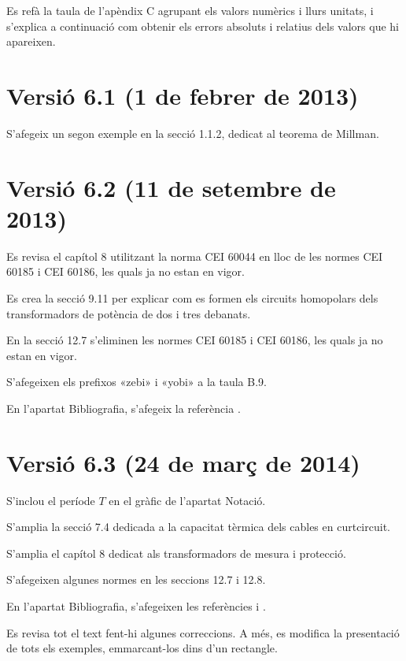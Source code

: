 Es refà la taula de l'apèndix C agrupant els valors numèrics i llurs unitats, i s'explica a continuació com obtenir els errors absoluts i relatius dels valors que hi apareixen.

\section*{Versió 6.1 (1 de febrer de 2013)}

S'afegeix un segon exemple en la secció 1.1.2, dedicat al teorema de Millman.


\section*{Versió 6.2 (11 de setembre de 2013)}

 Es revisa el capítol 8 utilitzant la norma CEI 60044 en lloc de les normes CEI 60185 i CEI 60186, les quals ja no estan en vigor.

Es crea la secció 9.11 per explicar com es formen els circuits homopolars dels transformadors de potència de dos i tres debanats.

En la secció 12.7 s'eliminen les normes CEI 60185 i CEI 60186, les quals ja no estan en vigor.

S'afegeixen els prefixos «zebi» i «yobi» a la taula B.9.

En l'apartat Bibliografia, s'afegeix la referència \cite{RASe}.

\section*{Versió 6.3 (24 de març de 2014)}

S'inclou el període $T$ en el gràfic de l'apartat Notació.

S'amplia la secció 7.4 dedicada a la capacitat tèrmica dels cables en curtcircuit.

S'amplia el capítol 8 dedicat als transformadors de mesura i protecció.

S'afegeixen algunes normes en les seccions 12.7 i 12.8.

En l'apartat Bibliografia, s'afegeixen les referències \cite{KAS} i \cite{JCD}.

Es revisa tot el text fent-hi algunes correccions. A més, es modifica la presentació de tots els exemples, emmarcant-los dins d'un rectangle.


